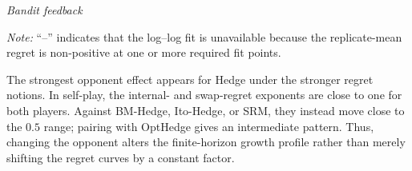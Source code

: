 \begin{table}[H]
    \vspace{0.8em}
    \textit{Bandit feedback}\par\smallskip

    \vspace{0.5em}
    \begin{minipage}{0.95\textwidth}
        \footnotesize
        \textit{Note:} ``--'' indicates that the log--log fit is unavailable
        because the replicate-mean regret is non-positive at one or more
        required fit points.
    \end{minipage}
\end{table}

The strongest opponent effect appears for Hedge under the stronger regret
notions. In self-play, the internal- and swap-regret exponents are close to
one for both players. Against BM-Hedge, Ito-Hedge, or SRM, they instead move
close to the $0.5$ range; pairing with OptHedge gives an intermediate pattern.
Thus, changing the opponent alters the finite-horizon growth profile rather
than merely shifting the regret curves by a constant factor.

